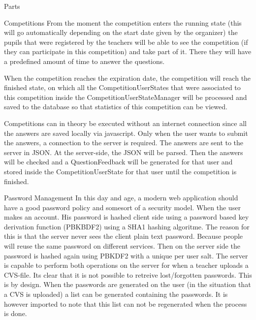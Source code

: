 \documentclass[]{article}
\begin{document}
\begin{section}{Parts}
\begin{subsection}{Competitions}
        From the moment the competition enters the running state (this will go
        automatically depending on the start date given by the organizer) the pupils
        that were registered by the teachers will be able to see the competition (if they can 
        participate in this competition) and take part of it. There they will have a predefined 
        amount of time to answer the questions.
        
        When the competition reaches the expiration date, the competition will reach the
        finished state, on which all the CompetitionUserStates that were associated to
        this competition inside the CompetitionUserStateManager will be processed and
        saved to the database so that statistics of this competition can be viewed.
        
        Competitions can in theory be executed without an internet connection since
        all the answers are saved locally via javascript. Only when the user wants to submit
        the answers, a connection to the server is required. The answers are sent to the
        server in JSON. At the server-side, the JSON will be parsed. Then the answers will
        be checked and a QuestionFeedback will be generated for that user and stored inside
        the CompetitionUserState for that user until the competition is finished.
        
    \end{subsection}
    \begin{subsection}{Password Management}
		In this day and age, a modern web application should have a good password policy and somesort of a 			security model. When the user makes an account. His password is hashed client side using a password based 			key derivation function (PBKBDF2) using a SHA1 hashing algoritme. The reason for this is that the server 			never sees the client plain text password. Because people will reuse the same password on different 		services. Then on the server side the password is hashed again using PBKDF2 with a unique per user salt. 			The server is capable to perform both operations on the server for when a teacher uploads a CVS-file. Its 			clear that it is not possible to retreive lost/forgotten passwords. This is by design. When the passwords 			are generated on the user (in the situation that a CVS is uploaded) a list can be generated containing the 			passwords. It is however imported to note that this list can not be regenerated when the process is done.
		

\end{subsection}
\end{section}
\end{document}

